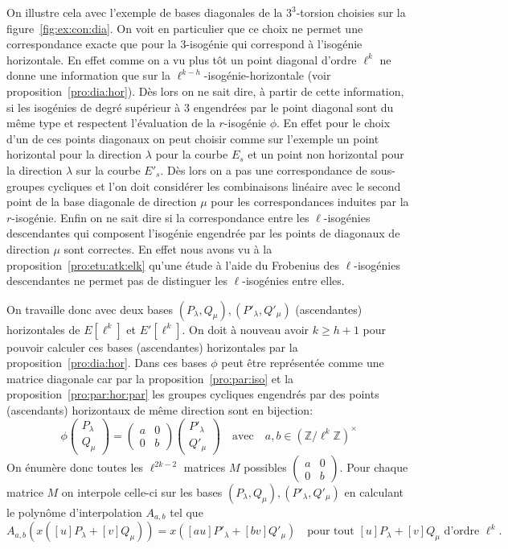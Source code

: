 \documentclass[10pt,a4paper]{book}
\theoremstyle{plain}
\theoremstyle{definition}
\theoremstyle{definition}
\theoremstyle{definition}
\theoremstyle{definition}
\theoremstyle{definition}
\theoremstyle{remark}
\theoremstyle{remark}
\theoremstyle{definition}
\begin{document}
On illustre cela avec l'exemple de bases diagonales de la $3^3$-torsion 
choisies sur la figure~\ref{fig:ex:con:dia}. On voit en 
particulier que ce choix ne permet une correspondance exacte que pour la 
$3$-isogénie qui correspond à l'isogénie horizontale. En effet comme on a vu
plus tôt un point diagonal d'ordre $\ell^k$ ne donne une information que sur la
$\ell^{k-h}$-isogénie-horizontale (voir proposition~\ref{pro:dia:hor}). Dès 
lors on ne sait dire, à partir de cette information, si les isogénies de degré 
supérieur à $3$ engendrées par le point diagonal sont du même type et respectent
l'évaluation de la $r$-isogénie $\phi$. En effet pour le choix d'un de ces points 
diagonaux on peut choisir comme sur l'exemple un point horizontal pour la 
direction $ \lambda$ pour la courbe $E_s$ et un point non horizontal
pour la direction $\lambda$ sur la courbe $E'_s$.  Dès lors on a 
pas une correspondance de sous-groupes cycliques et l'on doit considérer les 
combinaisons linéaire avec le second point de la base diagonale de direction 
$\mu$ pour les correspondances induites par la $r$-isogénie. Enfin
on ne sait dire si la correspondance entre les $\ell$-isogénies descendantes 
qui composent l'isogénie engendrée par les points de diagonaux de direction 
$\mu$ sont correctes. En effet nous avons vu à la 
proposition~\ref{pro:etu:atk:elk} qu'une étude à l'aide du Frobenius des 
$\ell$-isogénies descendantes ne permet pas de distinguer les $\ell$-isogénies 
entre elles.

 On travaille donc avec deux bases $(P_{\lambda}, Q_{\mu}),(P'_{\lambda},
 Q'_{\mu})$ (ascendantes) horizontales de $E[\ell^k]$ et $E'[\ell^k]$.
 On doit à nouveau avoir $k \geqslant h +1$ pour pouvoir calculer ces bases 
(ascendantes) horizontales par la proposition~\ref{pro:dia:hor}.
 Dans ces bases $\phi$ 
 peut être représentée comme une matrice diagonale car par la 
 proposition~\ref{pro:par:iso} et la proposition~\ref{pro:par:hor:par} les 
 groupes cycliques engendrés par des points (ascendants) horizontaux de
 même direction sont en bijection:
\[
\phi
\left(
\begin{matrix}
 P_{\lambda} \\
 Q_{\mu} 
\end{matrix}
\right)= \left(\begin{matrix}
a & 0 \\
0 & b
\end{matrix} \right)
\left(
\begin{matrix}
P'_{\lambda} \\
Q'_{\mu}
\end{matrix}
\right)
\quad \text{avec} \quad a,b \in \left( \mathbb{Z}/\ell^k\mathbb{Z} \right)^{\times}
\]
 On énumère donc toutes les $\ell^{2k-2}$ matrices $M$ possibles $\left( 
 \begin{smallmatrix} a & 0 \\ 0 & b \end{smallmatrix} \right)$. Pour chaque 
matrice $M$ on interpole celle-ci sur les bases $(P_{\lambda},Q_{\mu}),
(P'_{\lambda},Q'_{\mu})$ en calculant le polynôme d'interpolation $A_{a,b}$ tel
que 
\[
A_{a,b}(x([u]P_{\lambda} +[v]Q_{\mu}))=x([au]P'_{\lambda}+[bv]Q'_{\mu}) \quad 
\text{pour tout $[u]P_{\lambda}+[v]Q_{\mu}$ d'ordre $\ell^k$}.
\]
\end{document}

